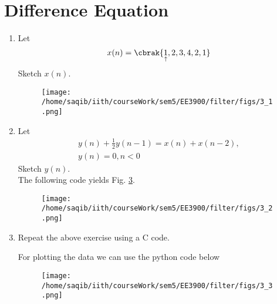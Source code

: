 \documentclass[journal,12pt,twocolumn]{IEEEtran}
\renewcommand\thesection{\arabic{section}}
\begin{document}
\section{Difference Equation}
\begin{enumerate}[label=\thesection.\arabic*,ref=\thesection.\theenumi]
\item Let
	\label{def:xn}
\begin{equation}
x(n) = \cbrak{\underset{\uparrow}{1},2,3,4,2,1}
\end{equation}
Sketch $x(n)$.\\
\solution

\begin{figure}[!ht]
\begin{center}
\texttt{[image: /home/saqib/iith/courseWork/sem5/EE3900/filter/figs/3\_1.png]}
\end{center}
\label{fig:xnyn}	
\end{figure}
\item Let
\begin{multline}
\label{eq:iir_filter}
y(n) + \frac{1}{2}y(n-1) = x(n) + x(n-2), 
\\
 y(n) = 0, n < 0
\end{multline}
Sketch $y(n)$.  
\\
\solution The following code yields Fig. \ref{fig:xnyn}.

\begin{figure}[!ht]
\begin{center}
\texttt{[image: /home/saqib/iith/courseWork/sem5/EE3900/filter/figs/3\_2.png]}
\end{center}
\label{fig:xnyn}	
\end{figure}
\item Repeat the above exercise using a C code.
\solution 

For plotting the data we can use the python code below

\begin{figure}[!ht]
\begin{center}
\texttt{[image: /home/saqib/iith/courseWork/sem5/EE3900/filter/figs/3\_3.png]}
\end{center}
\label{fig:xnyn}	
\end{figure}
\end{enumerate}
\end{document}

